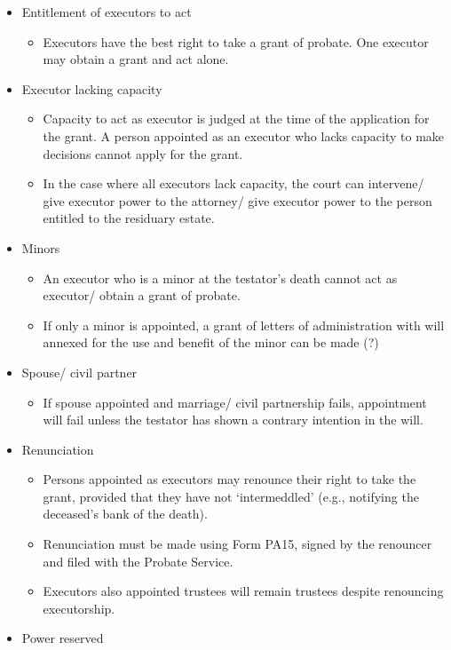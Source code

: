 \documentclass[
]{article}
\providecommand{\tightlist}{%
  \setlength{\itemsep}{0pt}\setlength{\parskip}{0pt}}
\begin{document}
\begin{itemize}
\tightlist
\item
  Entitlement of executors to act

  \begin{itemize}
  \tightlist
  \item
    Executors have the best right to take a grant of probate. One
    executor may obtain a grant and act alone.
  \end{itemize}
\item
  Executor lacking capacity

  \begin{itemize}
  \tightlist
  \item
    Capacity to act as executor is judged at the time of the application
    for the grant. A person appointed as an executor who lacks capacity
    to make decisions cannot apply for the grant.
  \item
    In the case where all executors lack capacity, the court can
    intervene/ give executor power to the attorney/ give executor power
    to the person entitled to the residuary estate.
  \end{itemize}
\item
  Minors

  \begin{itemize}
  \tightlist
  \item
    An executor who is a minor at the testator's death cannot act as
    executor/ obtain a grant of probate.
  \item
    If only a minor is appointed, a grant of letters of administration
    with will annexed for the use and benefit of the minor can be made
    (?)
  \end{itemize}
\item
  Spouse/ civil partner

  \begin{itemize}
  \tightlist
  \item
    If spouse appointed and marriage/ civil partnership fails,
    appointment will fail unless the testator has shown a contrary
    intention in the will.
  \end{itemize}
\item
  Renunciation

  \begin{itemize}
  \tightlist
  \item
    Persons appointed as executors may renounce their right to take the
    grant, provided that they have not `intermeddled' (e.g., notifying
    the deceased's bank of the death).
  \item
    Renunciation must be made using Form PA15, signed by the renouncer
    and filed with the Probate Service.
  \item
    Executors also appointed trustees will remain trustees despite
    renouncing executorship.
  \end{itemize}
\item
  Power reserved


\end{itemize}
\end{document}
